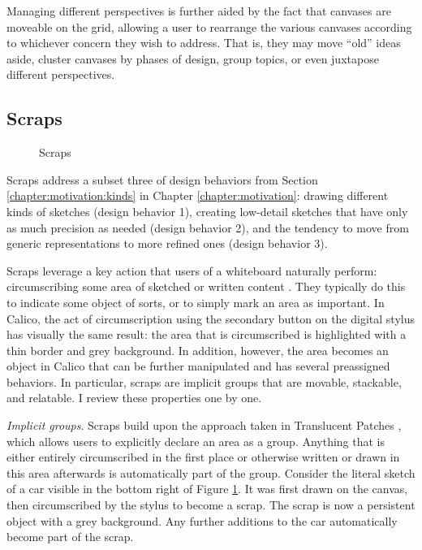 \documentclass[12pt,fleqn]{ucithesis}
\begin{document}
Managing different perspectives is further aided by the fact that canvases are moveable on the grid, allowing a user to rearrange the various canvases according to whichever concern they wish to address. That is, they may move ``old'' ideas aside, cluster canvases by phases of design, group topics, or even juxtapose different perspectives.

\subsection {Scraps}
\label{calico:3}

\begin{figure}
  \centering

\caption {Scraps}
\label{fig:5}       %
\end{figure}
%

Scraps address a subset three of design behaviors from Section \ref{chapter:motivation:kinds} in Chapter \ref{chapter:motivation}: drawing different kinds of sketches (design behavior 1), creating low-detail sketches that have only as much precision as needed (design behavior 2), and the tendency to move from generic representations to more refined ones (design behavior 3).

Scraps leverage a key action that users of a whiteboard naturally perform: circumscribing some area of sketched or written content \citep{Hendry}. They typically do this to indicate some object of sorts, or to simply mark an area as important. In Calico, the act of circumscription using the secondary button on the digital stylus has visually the same result: the area that is circumscribed is highlighted with a thin border and grey background. In addition, however, the area becomes an object in Calico that can be further manipulated and has several preassigned behaviors. In particular, scraps are implicit groups that are movable, stackable, and relatable. I review these properties one by one.

\emph{Implicit groups}. Scraps build upon the approach taken in Translucent Patches \citep{Kramer}, which allows users to explicitly declare an area as a group. Anything that is either entirely circumscribed in the first place or otherwise written or drawn in this area afterwards is automatically part of the group. Consider the literal sketch of a car visible in the bottom right of Figure \ref{fig:5}. It was first drawn on the canvas, then circumscribed by the stylus to become a scrap. The scrap is now a persistent object with a grey background. Any further additions to the car automatically become part of the scrap.
\end{document}
